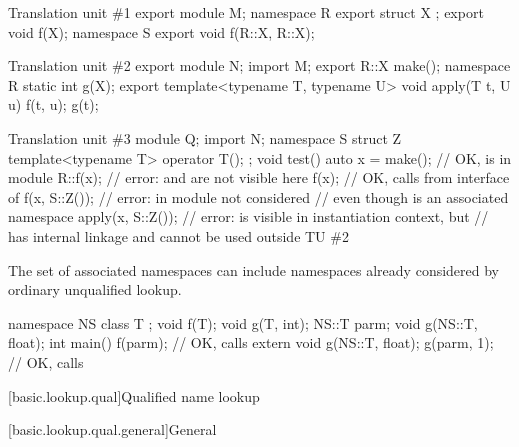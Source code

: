 \pnum
\begin{example}
\begin{codeblocktu}{Translation unit \#1}
export module M;
namespace R {
  export struct X {};
  export void f(X);
}
namespace S {
  export void f(R::X, R::X);
}
\end{codeblocktu}

\begin{codeblocktu}{Translation unit \#2}
export module N;
import M;
export R::X make();
namespace R { static int g(X); }
export template<typename T, typename U> void apply(T t, U u) {
  f(t, u);
  g(t);
}
\end{codeblocktu}

\begin{codeblocktu}{Translation unit \#3}
module Q;
import N;
namespace S {
  struct Z { template<typename T> operator T(); };
}
void test() {
  auto x = make();              // OK,  is  in module 
  R::f(x);                      // error:  and  are not visible here
  f(x);                         // OK, calls  from interface of 
  f(x, S::Z());                 // error:  in module  not considered
                                // even though  is an associated namespace
  apply(x, S::Z());             // error:  is visible in instantiation context, but
                                //  has internal linkage and cannot be used outside TU \#2
}
\end{codeblocktu}
\end{example}

\pnum
\begin{note}
The set of associated namespaces can include namespaces
already considered by ordinary unqualified lookup.
\end{note}
\begin{example}
\begin{codeblock}
namespace NS {
  class T { };
  void f(T);
  void g(T, int);
}
NS::T parm;
void g(NS::T, float);
int main() {
  f(parm);                      // OK, calls 
  extern void g(NS::T, float);
  g(parm, 1);                   // OK, calls 
}
\end{codeblock}
\end{example}

[basic.lookup.qual]{Qualified name lookup}

[basic.lookup.qual.general]{General}

